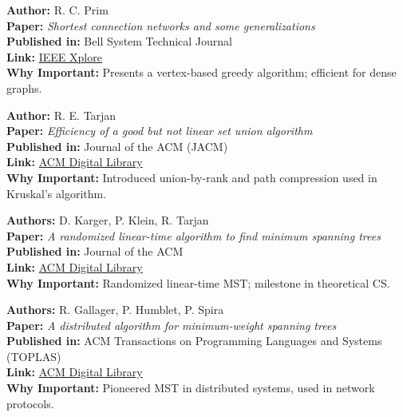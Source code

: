 \documentclass[14pt,a4paper]{extarticle}
\begin{document}
\begin{tcolorbox}[title=3. Prim’s Algorithm (1957)]
\textbf{Author:} R. C. Prim \\
\textbf{Paper:} \textit{Shortest connection networks and some generalizations} \\
\textbf{Published in:} Bell System Technical Journal \\
\textbf{Link:} \href{https://ieeexplore.ieee.org/document/6773135}{IEEE Xplore} \\
\textbf{Why Important:} Presents a vertex-based greedy algorithm; efficient for dense graphs.
\end{tcolorbox}

\begin{tcolorbox}[title=4. Tarjan’s Union-Find Optimization (1975)]
\textbf{Author:} R. E. Tarjan \\
\textbf{Paper:} \textit{Efficiency of a good but not linear set union algorithm} \\
\textbf{Published in:} Journal of the ACM (JACM) \\
\textbf{Link:} \href{https://dl.acm.org/doi/10.1145/321879.321884}{ACM Digital Library} \\
\textbf{Why Important:} Introduced union-by-rank and path compression used in Kruskal’s algorithm.
\end{tcolorbox}

\begin{tcolorbox}[title=5. Karger’s Randomized MST (1995)]
\textbf{Authors:} D. Karger, P. Klein, R. Tarjan \\
\textbf{Paper:} \textit{A randomized linear-time algorithm to find minimum spanning trees} \\
\textbf{Published in:} Journal of the ACM \\
\textbf{Link:} \href{https://dl.acm.org/doi/10.1145/210332.210337}{ACM Digital Library} \\
\textbf{Why Important:} Randomized linear-time MST; milestone in theoretical CS.
\end{tcolorbox}

\begin{tcolorbox}[title=6. Distributed MST (1983)]
\textbf{Authors:} R. Gallager, P. Humblet, P. Spira \\
\textbf{Paper:} \textit{A distributed algorithm for minimum-weight spanning trees} \\
\textbf{Published in:} ACM Transactions on Programming Languages and Systems (TOPLAS) \\
\textbf{Link:} \href{https://dl.acm.org/doi/10.1145/357172.357176}{ACM Digital Library} \\
\textbf{Why Important:} Pioneered MST in distributed systems, used in network protocols.
\end{tcolorbox}
\end{document}

